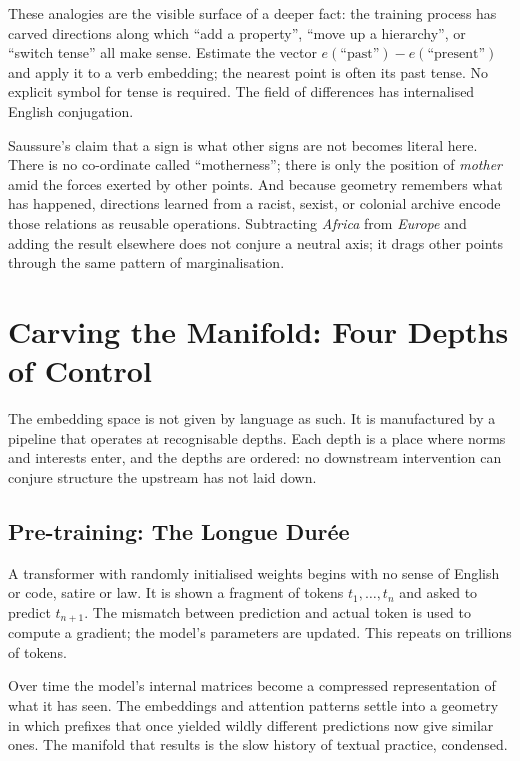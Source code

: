 \documentclass[12pt,a4paper]{article}
\begin{document}
These analogies are the visible surface of a deeper fact: the training process has carved directions along which ``add a property'', ``move up a hierarchy'', or ``switch tense'' all make sense. Estimate the vector $e(\text{``past''}) - e(\text{``present''})$ and apply it to a verb embedding; the nearest point is often its past tense. No explicit symbol for tense is required. The field of differences has internalised English conjugation.

Saussure's claim that a sign is what other signs are not becomes literal here. There is no co-ordinate called ``motherness''; there is only the position of \emph{mother} amid the forces exerted by other points. And because geometry remembers what has happened, directions learned from a racist, sexist, or colonial archive encode those relations as reusable operations. Subtracting \emph{Africa} from \emph{Europe} and adding the result elsewhere does not conjure a neutral axis; it drags other points through the same pattern of marginalisation.

\section{Carving the Manifold: Four Depths of Control}

The embedding space is not given by language as such. It is manufactured by a pipeline that operates at recognisable depths. Each depth is a place where norms and interests enter, and the depths are ordered: no downstream intervention can conjure structure the upstream has not laid down.

\subsection{Pre-training: The Longue Dur\'{e}e}

A transformer with randomly initialised weights begins with no sense of English or code, satire or law. It is shown a fragment of tokens $t_1, \dots, t_n$ and asked to predict $t_{n+1}$. The mismatch between prediction and actual token is used to compute a gradient; the model's parameters are updated. This repeats on trillions of tokens.

Over time the model's internal matrices become a compressed representation of what it has seen. The embeddings and attention patterns settle into a geometry in which prefixes that once yielded wildly different predictions now give similar ones. The manifold that results is the slow history of textual practice, condensed.
\end{document}
